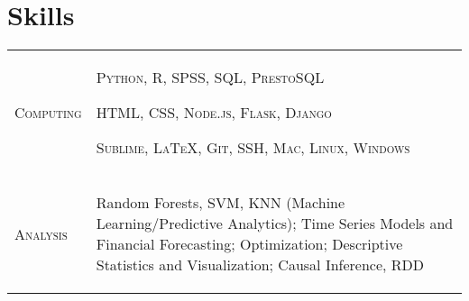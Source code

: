 \documentclass[a4paper,10pt]{article}
\begin{document}
\smallskip
\section{Skills}
\begin{supertabular}{p{3.4cm} p{13.9cm}}

	\textsc{Computing}			& \begin{enumerate*}[label =$\diamond$, itemjoin={\newline}]
																\item \small \textsc{Python, R, SPSS, SQL, PrestoSQL}
																\item \small \textsc{HTML, CSS, Node.js, Flask, Django}
																\item \small \textsc{Sublime, {\fb \LaTeX}, Git, SSH, Mac, Linux, Windows }
																\end{enumerate*} \vspace{2mm} \\


	\textsc{Analysis}				& \begin{enumerate*}[label =$\diamond$, itemjoin={\newline}]
                                \item \small Random Forests, SVM, KNN (Machine Learning/Predictive Analytics); Time Series Models and Financial Forecasting; Optimization; Descriptive Statistics and Visualization; Causal Inference, RDD \end{enumerate*}  \vspace{1mm} \\



\end{supertabular}




\smallskip
\end{document}
